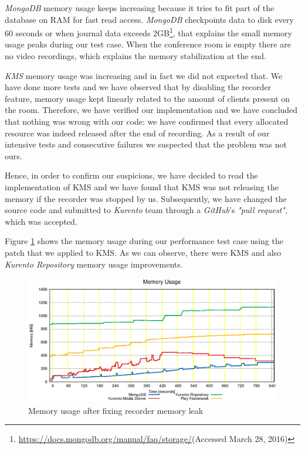 \emph{MongoDB} memory usage keeps increasing because it tries to fit part of the database on \ac{RAM} for fast read access. \emph{MongoDB} checkpoints data to disk every 60 seconds or when journal data exceeds 2GB\footnote{\url{https://docs.mongodb.org/manual/faq/storage/}(Accessed March 28, 2016)}, that explains the small memory usage peaks during our test case. When the conference room is empty there are no video recordings, which explains the memory stabilization at the end.

\emph{KMS} memory usage was increasing and in fact we did not expected that. We have done more tests and we have observed that by disabling the recorder feature, memory usage kept linearly related to the amount of clients present on the room. Therefore, we have verified our implementation and we have concluded that nothing was wrong with our code: we have confirmed that every allocated resource was indeed released after the end of recording. As a result of our intensive tests and consecutive failures we suspected that the problem was not ours.

Hence, in order to confirm our suspicions, we have decided to read the implementation of \ac{KMS} and we have found that \ac{KMS} was not releasing the memory if the recorder was stopped by us. Subsequently, we have changed the source code and submitted to \emph{Kurento} team through a \emph{GitHub}'s \emph{"pull request"}, which was accepted.


Figure \ref{fig:test_ram_fixed_mem} shows the memory usage during our performance test case using the patch that we applied to \ac{KMS}. As we can observe, there were \ac{KMS} and also \emph{Kurento Repository} memory usage improvements. 



\begin{figure}
  \centering
  \includegraphics[width=\textwidth]{stats/test_ram_fixed_mem.eps}
  \caption{Memory usage after fixing recorder memory leak}
  \label{fig:test_ram_fixed_mem}
\end{figure}


